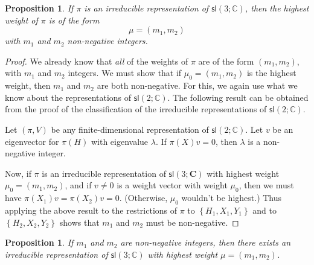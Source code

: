 \documentclass{amsbook}
\theoremstyle{plain}
\newtheorem{proposition}[theorem]{Proposition}
\numberwithin{equation}{chapter}
\numberwithin{theorem}{chapter}
\begin{document}
\begin{proposition}
If $\pi$ is an irreducible representation of $\mathsf{sl}\left(
3;\mathbb{C}\right)  $, then the highest weight of $\pi$ is of the form
\[
\mu=(m_{1},m_{2})
\]
with $m_{1}$ and $m_{2}$ non-negative integers.
\end{proposition}

\begin{proof}
We already know that \textit{all} of the weights of $\pi$ are of the form
$(m_{1},m_{2})$, with $m_{1}$ and $m_{2}$ integers. We must show that if
$\mu_{0}=(m_{1},m_{2})$ is the highest weight, then $m_{1}$ and $m_{2}$ are
both non-negative. For this, we again use what we know about the
representations of $\mathsf{sl}(2;\mathbb{C})$. The following result can be
obtained from the proof of the classification of the irreducible
representations of $\mathsf{sl}(2;\mathbb{C})$.

Let $\left(  \pi,V\right)  $ be any finite-dimensional representation of
$\mathsf{sl}(2;\mathbb{C})$. Let $v$ be an eigenvector for $\pi(H)$ with
eigenvalue $\lambda$. If $\pi(X)v=0$, then $\lambda$ is a non-negative integer.

Now, if $\pi$ is an irreducible representation of $\mathsf{sl}\left(
3;\mathbf{C}\right)  $ with highest weight $\mu_{0}=(m_{1},m_{2})$, and if
$v\neq0$ is a weight vector with weight $\mu_{0}$, then we must have
$\pi(X_{1})v=\pi(X_{2})v=0$. (Otherwise, $\mu_{0}$ wouldn't be highest.) Thus
applying the above result to the restrictions of $\pi$ to $\left\{
H_{1},X_{1},Y_{1}\right\}  $ and to $\left\{  H_{2},X_{2},Y_{2}\right\}  $
shows that $m_{1}$ and $m_{2}$ must be non-negative.
\end{proof}

\begin{proposition}
If $m_{1}$ and $m_{2}$ are non-negative integers, then there exists an
irreducible representation of $\mathsf{sl}\left(  3;\mathbb{C}\right)  $ with
highest weight $\mu=(m_{1},m_{2})$.
\end{proposition}
\end{document}
